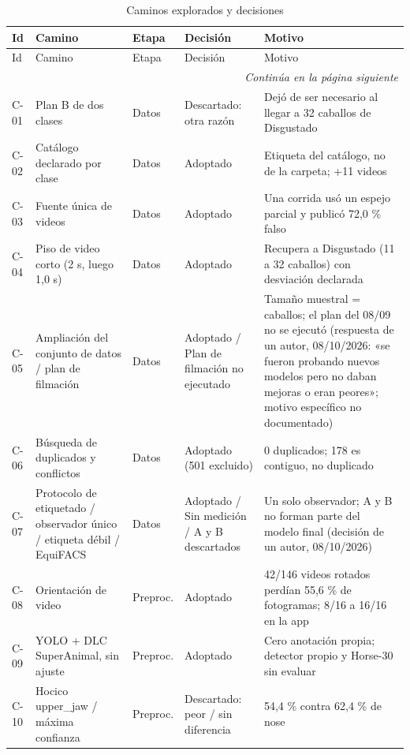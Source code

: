 \begingroup\singlespacing\footnotesize
\setlength{\LTleft}{0pt}\setlength{\LTright}{0pt}\setlength{\tabcolsep}{3pt}
\begin{longtable}{@{}p{}p{}p{}p{}p{}@{}}
\caption{Caminos explorados y decisiones}\label{tab:a-caminos}\\
\toprule
Id & Camino & Etapa & Decisión & Motivo \\
\midrule
\endfirsthead
\toprule
Id & Camino & Etapa & Decisión & Motivo \\
\midrule
\endhead
\midrule
\multicolumn{5}{r}{\textit{Continúa en la página siguiente}} \\
\endfoot
\bottomrule
\endlastfoot
C-01 & Plan B de dos clases & Datos & Descartado: otra razón & Dejó de ser necesario al llegar a 32 caballos de Disgustado \\
C-02 & Catálogo declarado por clase & Datos & Adoptado & Etiqueta del catálogo, no de la carpeta; +11 videos \\
C-03 & Fuente única de videos & Datos & Adoptado & Una corrida usó un espejo parcial y publicó 72,0 \% falso \\
C-04 & Piso de video corto (2 s, luego 1,0 s) & Datos & Adoptado & Recupera a Disgustado (11 a 32 caballos) con desviación declarada \\
C-05 & Ampliación del conjunto de datos / plan de filmación & Datos & Adoptado / Plan de filmación no ejecutado & Tamaño muestral = caballos; el plan del 08/09 no se ejecutó (respuesta de un autor, 08/10/2026: «se fueron probando nuevos modelos pero no daban mejoras o eran peores»; motivo específico no documentado) \\
C-06 & Búsqueda de duplicados y conflictos & Datos & Adoptado (501 excluido) & 0 duplicados; 178 es contiguo, no duplicado \\
C-07 & Protocolo de etiquetado / observador único / etiqueta débil / EquiFACS & Datos & Adoptado / Sin medición / A y B descartados & Un solo observador; A y B no forman parte del modelo final (decisión de un autor, 08/10/2026) \\
C-08 & Orientación de video & Preproc. & Adoptado & 42/146 videos rotados perdían 55,6 \% de fotogramas; 8/16 a 16/16 en la app \\
C-09 & YOLO + DLC SuperAnimal, sin ajuste & Preproc. & Adoptado & Cero anotación propia; detector propio y Horse-30 sin evaluar \\
C-10 & Hocico upper\_jaw / máxima confianza & Preproc. & Descartado: peor / sin diferencia & 54,4 \% contra 62,4 \% de nose \\

\end{longtable}
